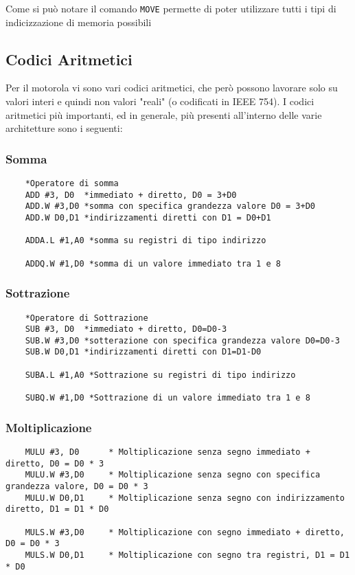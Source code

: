 Come si può notare il comando \lstinline|MOVE| permette di poter utilizzare tutti i tipi di indicizzazione di memoria possibili

\newpage

\subsection{Codici Aritmetici}
Per il motorola vi sono vari codici aritmetici, che però possono lavorare solo su valori interi e quindi non valori "reali" (o codificati in IEEE 754).
I codici aritmetici più importanti, ed in generale, più presenti all'interno delle varie architetture sono i seguenti:

\subsubsection{Somma}

\begin{lstlisting}
    *Operatore di somma
    ADD #3, D0  *immediato + diretto, D0 = 3+D0
    ADD.W #3,D0 *somma con specifica grandezza valore D0 = 3+D0
    ADD.W D0,D1 *indirizzamenti diretti con D1 = D0+D1

    ADDA.L #1,A0 *somma su registri di tipo indirizzo

    ADDQ.W #1,D0 *somma di un valore immediato tra 1 e 8
\end{lstlisting}

\subsubsection{Sottrazione}

\begin{lstlisting}
    *Operatore di Sottrazione
    SUB #3, D0  *immediato + diretto, D0=D0-3
    SUB.W #3,D0 *sotterazione con specifica grandezza valore D0=D0-3
    SUB.W D0,D1 *indirizzamenti diretti con D1=D1-D0

    SUBA.L #1,A0 *Sottrazione su registri di tipo indirizzo

    SUBQ.W #1,D0 *Sottrazione di un valore immediato tra 1 e 8
\end{lstlisting}

\subsubsection{Moltiplicazione}

\begin{lstlisting}
    MULU #3, D0      * Moltiplicazione senza segno immediato + diretto, D0 = D0 * 3  
    MULU.W #3,D0     * Moltiplicazione senza segno con specifica grandezza valore, D0 = D0 * 3  
    MULU.W D0,D1     * Moltiplicazione senza segno con indirizzamento diretto, D1 = D1 * D0  

    MULS.W #3,D0     * Moltiplicazione con segno immediato + diretto, D0 = D0 * 3  
    MULS.W D0,D1     * Moltiplicazione con segno tra registri, D1 = D1 * D0  
\end{lstlisting}

